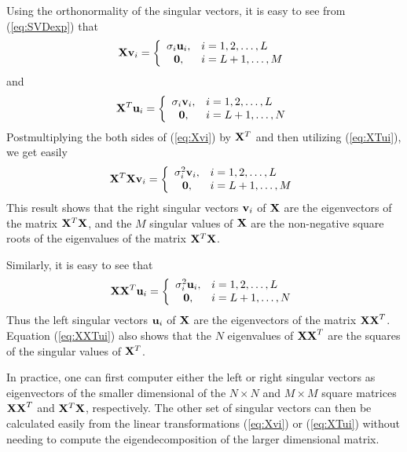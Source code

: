 \documentclass[10pt]{article}
\begin{document}
\begin{enumerate}
Using the orthonormality of the singular vectors, it is easy to see from
(\ref{eq:SVDexp}) that 
%
\begin{equation}
{\bf Xv}_i = \left\{ \begin{array}{cl}
\sigma_i {\bf u}_i, & i=1,2,\ldots,L \\
{\bf 0}, & i=L+1,\ldots,M 
\end{array} \right.
\label{eq:Xvi}
\end{equation}
%
and 
%
\begin{equation}
{\bf X}^T{\bf u}_i = \left\{ \begin{array}{cl}
\sigma_i {\bf v}_i, & i=1,2,\ldots,L \\
{\bf 0}, & i=L+1,\ldots,N 
\end{array} \right.
\label{eq:XTui}
\end{equation}
%
Postmultiplying the both sides of (\ref{eq:Xvi}) by ${\bf X}^T$ and then utilizing
(\ref{eq:XTui}), we get easily
%
\begin{equation}
{\bf X}^T{\bf Xv}_i = \left\{ \begin{array}{cl}
\sigma_i^2 {\bf v}_i, & i=1,2,\ldots,L \\
{\bf 0}, & i=L+1,\ldots,M 
\end{array} \right.
\label{eq:XTXvi}
\end{equation}
%
This result shows that the right singular vectors ${\bf v}_i$ of ${\bf X}$ are the
eigenvectors of the matrix ${\bf X}^T{\bf X}$, and the $M$ singular values of 
${\bf X}$ are the non-negative square roots of the eigenvalues of the matrix
${\bf X}^T{\bf X}$.

Similarly, it is easy to see that
%
\begin{equation}
{\bf XX}^T{\bf u}_i = \left\{ \begin{array}{cl}
\sigma_i^2 {\bf u}_i, & i=1,2,\ldots,L \\
{\bf 0}, & i=L+1,\ldots,N 
\end{array} \right.
\label{eq:XXTui}
\end{equation}
%
Thus the left singular vectors ${\bf u}_i$ of ${\bf X}$ are the eigenvectors of the
matrix ${\bf XX}^T$. Equation (\ref{eq:XXTui}) also shows that the $N$ eigenvalues of 
${\bf XX}^T$ are the squares of the singular values of ${\bf X}^T$.

In practice, one can first computer either the left or right singular vectors
as eigenvectors of the smaller dimensional of the $N \times N$ and $M \times M$
square matrices ${\bf XX}^T$ and ${\bf X}^T{\bf X}$, respectively. The other
set of singular vectors can then be calculated easily from the linear transformations
(\ref{eq:Xvi}) or (\ref{eq:XTui}) without needing to compute the eigendecomposition
of the larger dimensional matrix.


\end{enumerate}
\end{document}
